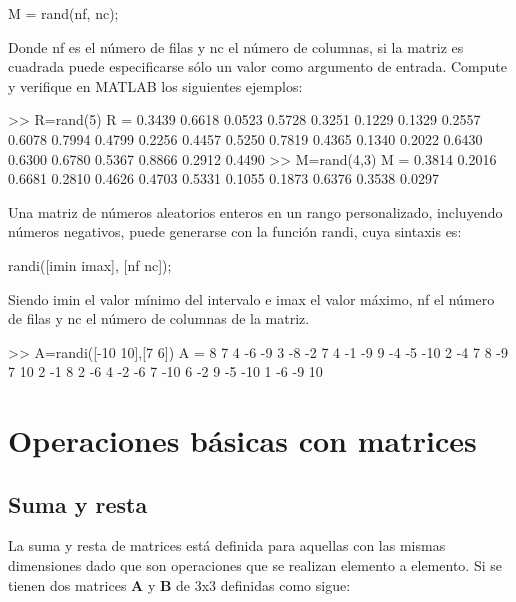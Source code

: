 \begin{matlab}
M = rand(nf, nc);
\end{matlab}

Donde nf es el número de filas y nc el número de columnas, si la matriz
es cuadrada puede especificarse sólo un valor como argumento de entrada.
Compute y verifique en MATLAB los siguientes ejemplos:

\begin{matlab}
>> R=rand(5)
R =
    0.3439    0.6618    0.0523    0.5728    0.3251
    0.1229    0.1329    0.2557    0.6078    0.7994
    0.4799    0.2256    0.4457    0.5250    0.7819
    0.4365    0.1340    0.2022    0.6430    0.6300
    0.6780    0.5367    0.8866    0.2912    0.4490
>> M=rand(4,3)
M =
    0.3814    0.2016    0.6681
    0.2810    0.4626    0.4703
    0.5331    0.1055    0.1873
    0.6376    0.3538    0.0297
\end{matlab}

Una matriz de números aleatorios enteros en un rango personalizado,
incluyendo números negativos, puede generarse con la función randi, cuya
sintaxis es:

\begin{matlab}
randi([imin imax], [nf nc]);
\end{matlab}

Siendo imin el valor mínimo del intervalo e imax el valor máximo, nf el
número de filas y nc el número de columnas de la matriz.

\begin{matlab}
>> A=randi([-10 10],[7 6])
A =
     8     7     4    -6    -9     3
    -8    -2     7     4    -1    -9
     9    -4    -5   -10     2    -4
     7     8    -9     7    10     2
    -1     8     2    -6     4    -2
    -6     7   -10     6    -2     9
    -5   -10     1    -6    -9    10
\end{matlab}

\section{Operaciones básicas con matrices}\label{operaciones-basicas-con-matrices}

\subsection{Suma y resta}\label{suma-y-resta}

La suma y resta de matrices está definida para aquellas con las mismas
dimensiones dado que son operaciones que se realizan elemento a
elemento. Si se tienen dos matrices \textbf{A} y \textbf{B} de 3x3
definidas como sigue:

